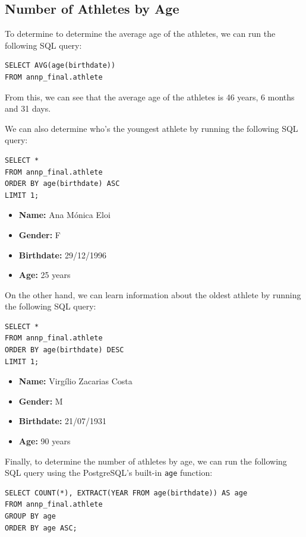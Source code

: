 \subsection{Number of Athletes by Age}\label{subsec:number-of-athletes-by-age}

To determine to determine the average age of the athletes, we can run the following SQL query:

\begin{verbatim}
SELECT AVG(age(birthdate))
FROM annp_final.athlete
\end{verbatim}

From this, we can see that the average age of the athletes is 46 years, 6 months and 31 days.

We can also determine who's the youngest athlete by running the following SQL query:

\begin{verbatim}
SELECT *
FROM annp_final.athlete
ORDER BY age(birthdate) ASC
LIMIT 1;
\end{verbatim}

\begin{itemize}
    \item \textbf{Name:} Ana Mónica Eloi
    \item \textbf{Gender:} F
    \item \textbf{Birthdate:} 29/12/1996
    \item \textbf{Age:} 25 years
\end{itemize}

On the other hand, we can learn information about the oldest athlete by running the following SQL query:

\begin{verbatim}
SELECT *
FROM annp_final.athlete
ORDER BY age(birthdate) DESC
LIMIT 1;
\end{verbatim}

\begin{itemize}
    \item \textbf{Name:} Virgílio Zacarias Costa
    \item \textbf{Gender:} M
    \item \textbf{Birthdate:} 21/07/1931
    \item \textbf{Age:} 90 years
\end{itemize}

Finally, to determine the number of athletes by age, we can run the following SQL query using the PostgreSQL's built-in
\texttt{age} function:

\begin{verbatim}
SELECT COUNT(*), EXTRACT(YEAR FROM age(birthdate)) AS age
FROM annp_final.athlete
GROUP BY age
ORDER BY age ASC;
\end{verbatim}

